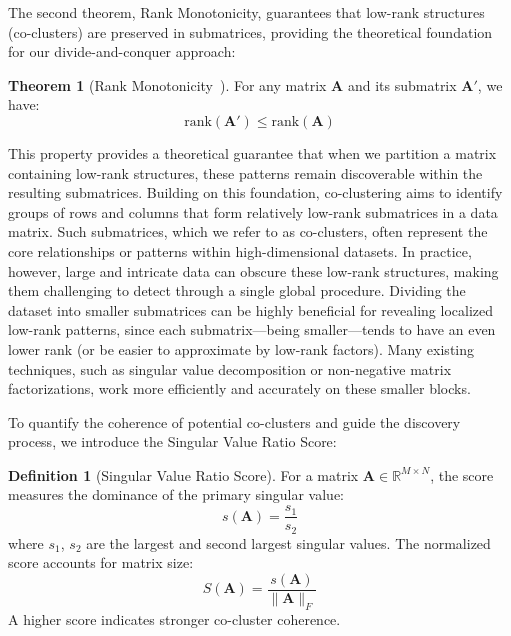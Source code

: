 \documentclass[journal]{IEEEtran}
\theoremstyle{definition}
\newtheorem{theorem}{Theorem}
\newtheorem{definition}{Definition}
\theoremstyle{remark} %
\renewcommand{\cite}[1]{~\autocite{#1}}
\begin{document}
The second theorem, Rank Monotonicity, guarantees that low-rank structures (co-clusters) are preserved in submatrices, providing the theoretical foundation for our divide-and-conquer approach:

\begin{theorem}[Rank Monotonicity\cite{horn1985MatrixAnalysis}] \label{thm:rank-monotonicity}
    For any matrix $\mathbf{A}$ and its submatrix $\mathbf{A}'$, we have:
    \begin{equation}
        \text{rank}(\mathbf{A}') \leq \text{rank}(\mathbf{A})
    \end{equation}
\end{theorem}

This property provides a theoretical guarantee that when we partition a matrix containing low-rank structures, these patterns remain discoverable within the resulting submatrices. Building on this foundation, co-clustering aims to identify groups of rows and columns that form relatively low-rank submatrices in a data matrix. Such submatrices, which we refer to as co-clusters, often represent the core relationships or patterns within high-dimensional datasets. In practice, however, large and intricate data can obscure these low-rank structures, making them challenging to detect through a single global procedure. Dividing the dataset into smaller submatrices can be highly beneficial for revealing localized low-rank patterns, since each submatrix—being smaller—tends to have an even lower rank (or be easier to approximate by low-rank factors). Many existing techniques, such as singular value decomposition or non-negative matrix factorizations, work more efficiently and accurately on these smaller blocks.

To quantify the coherence of potential co-clusters and guide the discovery process, we introduce the Singular Value Ratio Score:

\begin{definition}[Singular Value Ratio Score]
    For a matrix $\mathbf{A} \in \mathbb{R}^{M \times N}$, the score measures the dominance of the primary singular value:
    \begin{equation}
        s(\mathbf{A}) = \frac{s_1}{s_2}
    \end{equation}
    where $s_1$, $s_2$ are the largest and second largest singular values. The normalized score accounts for matrix size:
    \begin{equation}
        S(\mathbf{A}) = \frac{s(\mathbf{A})}{\|\mathbf{A}\|_F}
    \end{equation}
    A higher score indicates stronger co-cluster coherence.
\end{definition}
\end{document}
